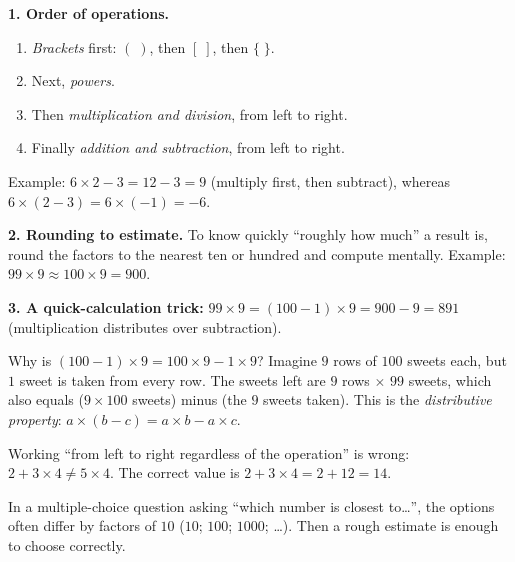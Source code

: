 \begin{knowbox}
\textbf{1. Order of operations.}
\begin{enumerate}[leftmargin=1.6em,itemsep=1pt,topsep=2pt]
  \item \emph{Brackets} first: $(\;)$, then $[\;]$, then $\{\;\}$.
  \item Next, \emph{powers}.
  \item Then \emph{multiplication and division}, from left to right.
  \item Finally \emph{addition and subtraction}, from left to right.
\end{enumerate}
Example: $6\times 2 - 3 = 12 - 3 = 9$ (multiply first, then subtract), whereas $6\times(2-3) = 6\times(-1) = -6$.

\textbf{2. Rounding to estimate.} To know quickly ``roughly how much'' a result is, round the factors to the nearest
ten or hundred and compute mentally. Example: $99 \times 9 \approx 100 \times 9 = 900$.

\textbf{3. A quick-calculation trick:} $99 \times 9 = (100-1)\times 9 = 900 - 9 = 891$ (multiplication distributes
over subtraction).
\end{knowbox}
\begin{proofbox}
Why is $(100-1)\times 9 = 100\times 9 - 1\times 9$? Imagine $9$ rows of $100$ sweets each, but $1$ sweet is taken from
every row. The sweets left are $9$ rows $\times$ $99$ sweets, which also equals ($9\times 100$ sweets) minus (the $9$
sweets taken). This is the \emph{distributive property}: $a\times(b-c) = a\times b - a\times c$.
\end{proofbox}
\begin{warnbox}
Working ``from left to right regardless of the operation'' is wrong: $2 + 3\times 4 \ne 5\times 4$. The correct
value is $2 + 3\times 4 = 2 + 12 = 14$.
\end{warnbox}
\begin{tipbox}
In a multiple-choice question asking ``which number is closest to\ldots'', the options often differ by factors of $10$
($10$; $100$; $1000$; \ldots). Then a rough estimate is enough to choose correctly.
\end{tipbox}

